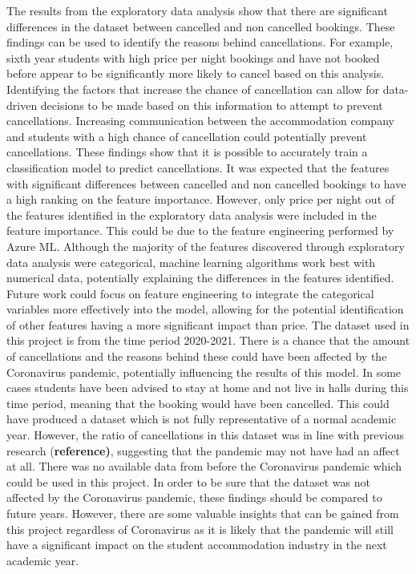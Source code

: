 The results from the exploratory data analysis show that there are significant differences in the dataset between cancelled and non cancelled bookings. These findings can be used to identify the reasons behind cancellations. For example, sixth year students with high price per night bookings and have not booked before appear to be significantly more likely to cancel based on this analysis. Identifying the factors that increase the chance of cancellation can allow for data-driven decisions to be made based on this information to attempt to prevent cancellations. Increasing communication between the accommodation company and students with a high chance of cancellation could potentially prevent cancellations. These findings show that it is possible to accurately train a classification model to predict cancellations. 
\vspace{5mm}
It was expected that the features with significant differences between cancelled and non cancelled bookings to have a high ranking on the feature importance. However, only price per night out of the features identified in the exploratory data analysis were included in the feature importance. This could be due to the feature engineering performed by Azure ML. Although the majority of the features discovered through exploratory data analysis were categorical, machine learning algorithms work best with numerical data, potentially explaining the differences in the features identified. Future work could focus on feature engineering to integrate the categorical variables more effectively into the model, allowing for the potential identification of other features having a more significant impact than price. 
\vspace{5mm}
The dataset used in this project is from the time period 2020-2021. There is a chance that the amount of cancellations and the reasons behind these could have been affected by the Coronavirus pandemic, potentially influencing the results of this model. In some cases students have been advised to stay at home and not live in halls during this time period, meaning that the booking would have been cancelled. This could have produced a dataset which is not fully representative of a normal academic year. However, the ratio of cancellations in this dataset was in line with previous research (\textbf{reference)}, suggesting that the pandemic may not have had an affect at all. There was no available data from before the Coronavirus pandemic which could be used in this project. In order to be sure that the dataset was not affected by the Coronavirus pandemic, these findings should be compared to future years. However, there are some valuable insights that can be gained from this project regardless of Coronavirus as it is likely that the pandemic will still have a significant impact on the student accommodation industry in the next academic year. 
 
